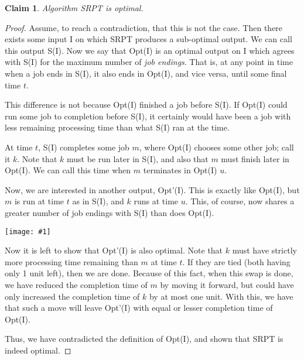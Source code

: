 \documentclass{article}
\newtheorem{thm}{Claim}
\providecommand{\image}[1]{
    \begin{center}
        \texttt{[image: \#1]}
    \end{center}
}
\begin{document}
    \begin{thm}
        Algorithm SRPT is optimal.
    \end{thm}
    \begin{proof}
        Assume, to reach a contradiction, that this is not the case.
        Then there exists some input I on which SRPT produces a sub-optimal output.
        We can call this output S(I).
        Now we say that Opt(I) is an optimal output on I which agrees with S(I) for the maximum number of \emph{job endings}.
        That is, at any point in time when a job ends in S(I), it also ends in Opt(I), and vice versa, until some final time $t$.
        
        This difference is not because Opt(I) finished a job before S(I).
        If Opt(I) could run some job to completion before S(I), it certainly would have been a job with less remaining processing time than what S(I) ran at the time.
        
        At time $t$, S(I) completes some job $m$, where Opt(I) chooses some other job; call it $k$.
        Note that $k$ must be run later in S(I), and also that $m$ must finish later in Opt(I).
        We can call this time when $m$ terminates in Opt(I) $u$.
        
        Now, we are interested in another output, Opt'(I). 
        This is exactly like Opt(I), but $m$ is run at time $t$ as in S(I), and $k$ runs at time $u$.
        This, of course, now shares a greater number of job endings with S(I) than does Opt(I).
        
        \image{p10btable}
        
        Now it is left to show that Opt'(I) is also optimal.
        Note that $k$ must have strictly more processing time remaining than $m$ at time $t$.
        If they are tied (both having only 1 unit left), then we are done.
        Because of this fact, when this swap is done, we have reduced the completion time of $m$ by moving it forward, but could have only increased the completion time of $k$ by at most one unit.
        With this, we have that such a move will leave Opt'(I) with equal or lesser completion time of Opt(I).
        
        Thus, we have contradicted the definition of Opt(I), and shown that SRPT is indeed optimal.
    \end{proof}
\end{document}
